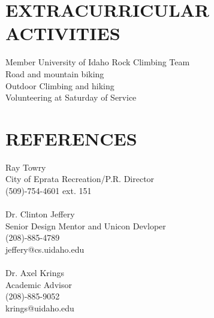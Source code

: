 \begin{resume}
\section{EXTRACURRICULAR ACTIVITIES}          
    Member University of Idaho Rock Climbing Team \\
    Road and mountain biking \\
    Outdoor Climbing and hiking \\
    Volunteering at Saturday of Service

    \pagebreak
\section{REFERENCES}
Ray Towry \\
City of Eprata Recreation/P.R. Director \\
(509)-754-4601 ext. 151 \\ \\
Dr. Clinton Jeffery \\
Senior Design Mentor and Unicon Devloper\\
(208)-885-4789\\
jeffery@cs.uidaho.edu \\ \\
Dr. Axel Krings \\
Academic Advisor\\
(208)-885-9052\\
krings@uidaho.edu

 
\end{resume}

